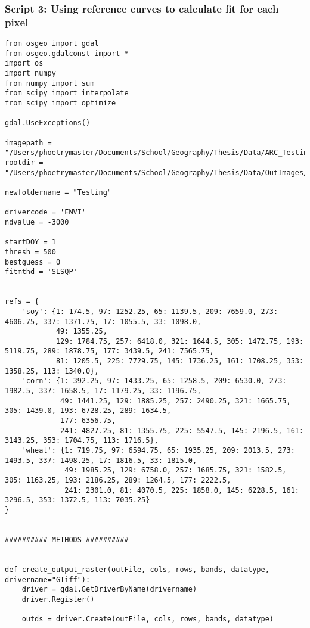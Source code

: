 \subsubsection*{Script 3: Using reference curves to calculate fit for each pixel}\label{script3}
\begin{verbatim}
from osgeo import gdal
from osgeo.gdalconst import *
import os
import numpy
from numpy import sum
from scipy import interpolate
from scipy import optimize

gdal.UseExceptions()

imagepath = "/Users/phoetrymaster/Documents/School/Geography/Thesis/Data/ARC_Testing/ClipTesting/ENVI_1/test_clip_envi_3.dat"
rootdir = "/Users/phoetrymaster/Documents/School/Geography/Thesis/Data/OutImages/"

newfoldername = "Testing"

drivercode = 'ENVI'
ndvalue = -3000

startDOY = 1
thresh = 500
bestguess = 0
fitmthd = 'SLSQP'


refs = {
    'soy': {1: 174.5, 97: 1252.25, 65: 1139.5, 209: 7659.0, 273: 4606.75, 337: 1371.75, 17: 1055.5, 33: 1098.0,
            49: 1355.25,
            129: 1784.75, 257: 6418.0, 321: 1644.5, 305: 1472.75, 193: 5119.75, 289: 1878.75, 177: 3439.5, 241: 7565.75,
            81: 1205.5, 225: 7729.75, 145: 1736.25, 161: 1708.25, 353: 1358.25, 113: 1340.0},
    'corn': {1: 392.25, 97: 1433.25, 65: 1258.5, 209: 6530.0, 273: 1982.5, 337: 1658.5, 17: 1179.25, 33: 1196.75,
             49: 1441.25, 129: 1885.25, 257: 2490.25, 321: 1665.75, 305: 1439.0, 193: 6728.25, 289: 1634.5,
             177: 6356.75,
             241: 4827.25, 81: 1355.75, 225: 5547.5, 145: 2196.5, 161: 3143.25, 353: 1704.75, 113: 1716.5},
    'wheat': {1: 719.75, 97: 6594.75, 65: 1935.25, 209: 2013.5, 273: 1493.5, 337: 1498.25, 17: 1816.5, 33: 1815.0,
              49: 1985.25, 129: 6758.0, 257: 1685.75, 321: 1582.5, 305: 1163.25, 193: 2186.25, 289: 1264.5, 177: 2222.5,
              241: 2301.0, 81: 4070.5, 225: 1858.0, 145: 6228.5, 161: 3296.5, 353: 1372.5, 113: 7035.25}
}


########## METHODS ##########


def create_output_raster(outFile, cols, rows, bands, datatype, drivername="GTiff"):
    driver = gdal.GetDriverByName(drivername)
    driver.Register()

    outds = driver.Create(outFile, cols, rows, bands, datatype)


\end{verbatim}
